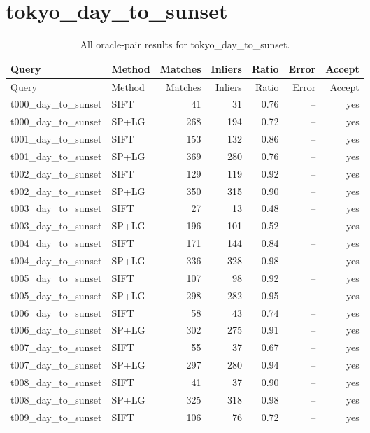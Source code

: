 \section{tokyo\_day\_to\_sunset}
\begingroup\scriptsize\setlength{\tabcolsep}{3pt}
\begin{longtable}{llrrrrr}
\caption{All oracle-pair results for tokyo\_day\_to\_sunset.}\\
\toprule
Query & Method & Matches & Inliers & Ratio & Error & Accept\\\midrule\endfirsthead
\toprule Query & Method & Matches & Inliers & Ratio & Error & Accept\\\midrule\endhead
\bottomrule\endfoot
t000\_day\_to\_sunset & SIFT & 41 & 31 & 0.76 & -- & yes \\
t000\_day\_to\_sunset & SP+LG & 268 & 194 & 0.72 & -- & yes \\
t001\_day\_to\_sunset & SIFT & 153 & 132 & 0.86 & -- & yes \\
t001\_day\_to\_sunset & SP+LG & 369 & 280 & 0.76 & -- & yes \\
t002\_day\_to\_sunset & SIFT & 129 & 119 & 0.92 & -- & yes \\
t002\_day\_to\_sunset & SP+LG & 350 & 315 & 0.90 & -- & yes \\
t003\_day\_to\_sunset & SIFT & 27 & 13 & 0.48 & -- & yes \\
t003\_day\_to\_sunset & SP+LG & 196 & 101 & 0.52 & -- & yes \\
t004\_day\_to\_sunset & SIFT & 171 & 144 & 0.84 & -- & yes \\
t004\_day\_to\_sunset & SP+LG & 336 & 328 & 0.98 & -- & yes \\
t005\_day\_to\_sunset & SIFT & 107 & 98 & 0.92 & -- & yes \\
t005\_day\_to\_sunset & SP+LG & 298 & 282 & 0.95 & -- & yes \\
t006\_day\_to\_sunset & SIFT & 58 & 43 & 0.74 & -- & yes \\
t006\_day\_to\_sunset & SP+LG & 302 & 275 & 0.91 & -- & yes \\
t007\_day\_to\_sunset & SIFT & 55 & 37 & 0.67 & -- & yes \\
t007\_day\_to\_sunset & SP+LG & 297 & 280 & 0.94 & -- & yes \\
t008\_day\_to\_sunset & SIFT & 41 & 37 & 0.90 & -- & yes \\
t008\_day\_to\_sunset & SP+LG & 325 & 318 & 0.98 & -- & yes \\
t009\_day\_to\_sunset & SIFT & 106 & 76 & 0.72 & -- & yes \\

\end{longtable}
